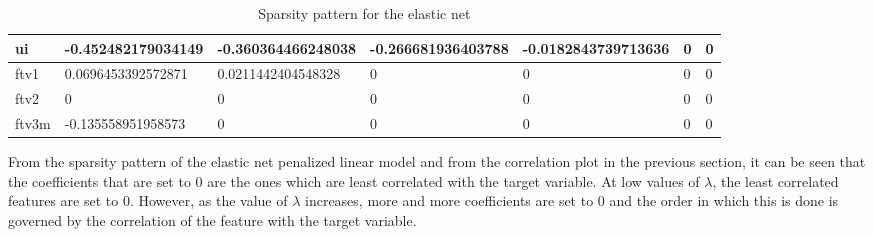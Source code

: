 \documentclass[a4paper,12pt]{article}
\begin{document}
\begin{table}[H]
{\begin{tabular}{|l|l|l|l|l|l|l|}
ui          & -0.452482179034149 & -0.360364466248038  & -0.266681936403788  & -0.0182843739713636 & 0               & 0               \\ \hline
ftv1        & 0.0696453392572871 & 0.0211442404548328  & 0                   & 0                   & 0               & 0               \\ \hline
ftv2        & 0                  & 0                   & 0                   & 0                   & 0               & 0               \\ \hline
ftv3m       & -0.135558951958573 & 0                   & 0                   & 0                   & 0               & 0               \\ \hline
\end{tabular}
}
\caption{Sparsity pattern for the elastic net}
\end{table}
From the sparsity pattern of the elastic net penalized linear model and from the correlation plot in the previous section, it can be seen that the coefficients that are set to 0 are the ones which are least correlated with the target variable. At low values of $\lambda$, the least correlated features are set to 0. However, as the value of $\lambda$ increases, more and more coefficients are set to 0 and the order in which this is done is governed by the correlation of the feature with the target variable. 
\newpage
\end{document}
